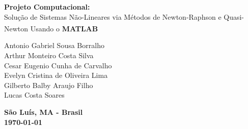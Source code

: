 \documentclass[
	12pt,				%
	oneside,			%
	a4paper,			%
	english,			%
	french,				%
	spanish,			%
	brazil				%
	]{abntex2}
\newcommand{\MATLAB}{MATLAB\textsuperscript{\textregistered}\xspace}
\begin{document}
\begin{center}
					\textbf{\large{Projeto Computacional:}}\\
					\large{Solução de Sistemas Não-Lineares via Métodos de Newton-Raphson e Quasi-Newton Usando o \textbf{\MATLAB}}
					\vspace{2.5cm}
					\begin{flushright}
						\textnormal{Antonio Gabriel Sousa Borralho\\Arthur Monteiro Costa Silva\\Cesar Eugenio Cunha de Carvalho\\Evelyn Cristina de Oliveira Lima\\Gilberto Balby Araujo Filho\\Lucas Costa Soares\\}
					\end{flushright}
					\vspace{2.5cm}
					\textbf{São Luís, MA - Brasil\\ \today}
\end{center}
\renewcommand{\folhaderostocontent}{  %
    \begin{center}
        {\ABNTEXchapterfont\imprimirautor}
        \vspace*{\fill}\vspace*{\fill}
        \begin{center}
            \ABNTEXchapterfont\bfseries\Large\imprimirtitulo
        \end{center}
        \vspace*{\fill}
        \abntex{}{%
            \hspace{.45\textwidth}
            \begin{minipage}{.5\textwidth}
                \SingleSpacing
                \imprimirpreambulo
            \end{minipage}%
            \vspace*{\fill}
        }%
        {\large\imprimirlocal}
        \par
        {\large\imprimirdata}
    \end{center}
}
\makeatother
\imprimirfolhaderosto

\tableofcontents*
\cleardoublepage
\end{document}
